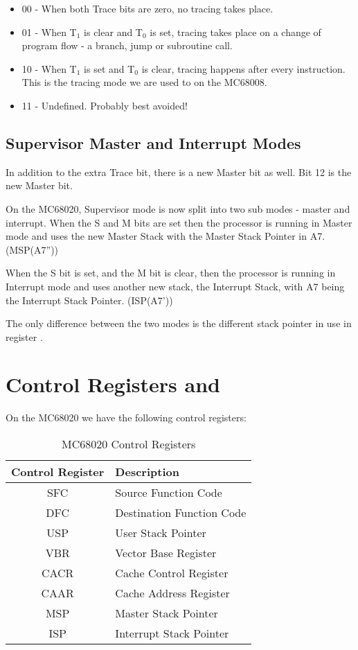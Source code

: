 \begin{itemize}
	\item 00 - When both Trace bits are zero, no tracing takes place.
	\item 01 - When T$_{1}$ is clear and T$_{0}$ is set, tracing takes place on a change of program flow - a branch, jump or subroutine call.
	\item 10 - When T$_{1}$ is set and T$_{0}$ is clear, tracing happens after every instruction. This is the tracing mode we are used to on the MC68008.
	\item 11 - Undefined. Probably best avoided!
\end{itemize}

\subsection{Supervisor Master and Interrupt Modes}

In addition to the extra Trace bit, there is a new Master bit as well. Bit 12 is the new Master bit.

On the MC68020, Supervisor mode is now split into two sub modes - master and interrupt. When the S and M bits are set then the processor is running in Master mode and uses the new Master Stack with the Master Stack Pointer in A7. (MSP(A7''))

When the S bit is set, and the M bit is clear, then the processor is running in Interrupt mode and uses another new stack, the Interrupt Stack, with A7 being the Interrupt Stack Pointer. (ISP(A7'))

The only difference between the two modes is the different stack pointer in use in register .


\section{Control Registers and }

On the MC68020 we have the following control registers:

\begin{table}[h]
	\centering
	\begin{tabular}{c|l}
		\textbf{Control Register} & \textbf{Description}\\
		\toprule
		SFC  & Source Function Code\\
		DFC  & Destination Function Code\\
		USP  & User Stack Pointer\\
		VBR  & Vector Base Register\\
		CACR & Cache Control Register\\
		CAAR & Cache Address Register\\
		MSP  & Master Stack Pointer\\
		ISP  & Interrupt Stack Pointer\\
	\end{tabular}
	\caption{MC68020 Control Registers}
	\label{tab-MCCR}
\end{table}

